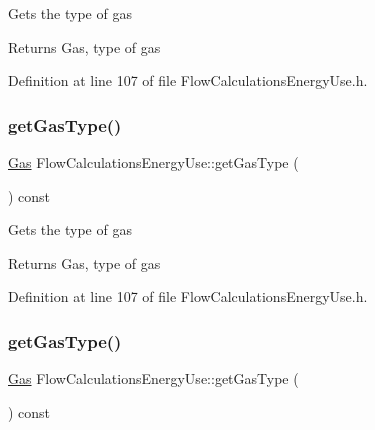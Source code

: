 Gets the type of gas

\begin{DoxyReturn}{Returns}
Gas, type of gas 
\end{DoxyReturn}


Definition at line 107 of file Flow\+Calculations\+Energy\+Use.\+h.

\mbox{\label{class_flow_calculations_energy_use_a04df0a0c655c4aef3d5a4539d57fec2e}} 
\subsubsection{\texorpdfstring{get\+Gas\+Type()}{getGasType()}\hspace{0.1cm}{\footnotesize\ttfamily [2/3]}}
{\footnotesize\ttfamily \hyperlink{class_flow_calculations_energy_use_a840d5a836e7b05d6791b79bace4440f2}{Gas} Flow\+Calculations\+Energy\+Use\+::get\+Gas\+Type (\begin{DoxyParamCaption}{ }\end{DoxyParamCaption}) const\hspace{0.3cm}{\ttfamily [inline]}}

Gets the type of gas

\begin{DoxyReturn}{Returns}
Gas, type of gas 
\end{DoxyReturn}


Definition at line 107 of file Flow\+Calculations\+Energy\+Use.\+h.

\mbox{\label{class_flow_calculations_energy_use_a04df0a0c655c4aef3d5a4539d57fec2e}} 
\subsubsection{\texorpdfstring{get\+Gas\+Type()}{getGasType()}\hspace{0.1cm}{\footnotesize\ttfamily [3/3]}}
{\footnotesize\ttfamily \hyperlink{class_flow_calculations_energy_use_a840d5a836e7b05d6791b79bace4440f2}{Gas} Flow\+Calculations\+Energy\+Use\+::get\+Gas\+Type (\begin{DoxyParamCaption}{ }\end{DoxyParamCaption}) const\hspace{0.3cm}{\ttfamily [inline]}}

